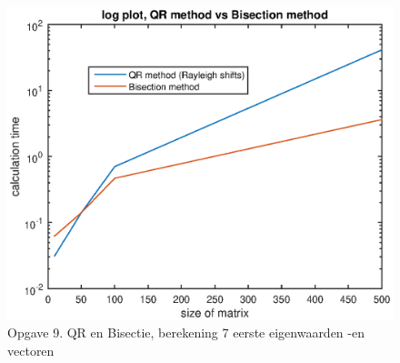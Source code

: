 \documentclass[]{article}
\begin{document}
\begin{figure}
\begin{center}
\includegraphics[width=1\textwidth]{opgave9log.eps}
\end{center}
\caption{Opgave 9. QR en Bisectie, berekening 7 eerste eigenwaarden -en vectoren}
\label{opgave9log}
\end{figure}
\end{document}
